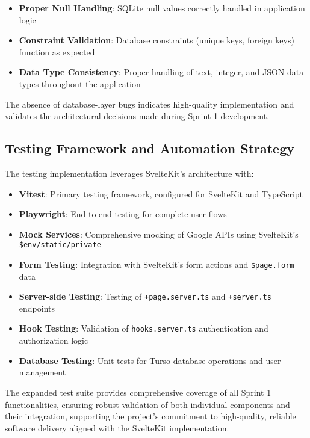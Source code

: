 \documentclass[12pt]{article}
\begin{document}
\begin{itemize}
  \item \textbf{Proper Null Handling}: SQLite null values correctly handled in application logic
  \item \textbf{Constraint Validation}: Database constraints (unique keys, foreign keys) function as expected
  \item \textbf{Data Type Consistency}: Proper handling of text, integer, and JSON data types throughout the application
\end{itemize}

The absence of database-layer bugs indicates high-quality implementation and validates the architectural decisions made during Sprint 1 development.

\subsection{Testing Framework and Automation Strategy}

The testing implementation leverages SvelteKit's architecture with:

\begin{itemize}
  \item \textbf{Vitest}: Primary testing framework, configured for SvelteKit and TypeScript
  \item \textbf{Playwright}: End-to-end testing for complete user flows
  \item \textbf{Mock Services}: Comprehensive mocking of Google APIs using SvelteKit's \texttt{\$env/static/private}
  \item \textbf{Form Testing}: Integration with SvelteKit's form actions and \texttt{\$page.form} data
  \item \textbf{Server-side Testing}: Testing of \texttt{+page.server.ts} and \texttt{+server.ts} endpoints
  \item \textbf{Hook Testing}: Validation of \texttt{hooks.server.ts} authentication and authorization logic
  \item \textbf{Database Testing}: Unit tests for Turso database operations and user management
\end{itemize}

The expanded test suite provides comprehensive coverage of all Sprint 1 functionalities, ensuring robust validation of both individual components and their integration, supporting the project's commitment to high-quality, reliable software delivery aligned with the SvelteKit implementation.
\end{document}

